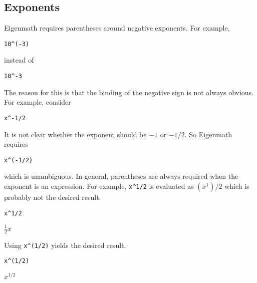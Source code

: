 
\subsection{Exponents}
Eigenmath requires parentheses around negative exponents.
For example,

\begin{Verbatim}[formatcom=\color{blue}]
10^(-3)
\end{Verbatim}

instead of

\begin{Verbatim}[formatcom=\color{blue}]
10^-3
\end{Verbatim}

The reason for this is that the binding of the negative sign is not always
obvious.
For example, consider

\begin{Verbatim}[formatcom=\color{blue}]
x^-1/2
\end{Verbatim}

It is not clear whether the exponent should be $-1$ or $-1/2$.
So Eigenmath requires

\begin{Verbatim}[formatcom=\color{blue}]
x^(-1/2)
\end{Verbatim}

which is unambiguous.
In general, parentheses are always required when the exponent
is an expression.
For example, \verb$x^1/2$ is evaluated as $(x^1)/2$ which
is probably not the desired result.

\begin{Verbatim}[formatcom=\color{blue}]
x^1/2
\end{Verbatim}

$\displaystyle \frac{1}{2}x$

Using \verb$x^(1/2)$ yields the desired result.

\begin{Verbatim}[formatcom=\color{blue}]
x^(1/2)
\end{Verbatim}

$\displaystyle x^{1/2}$
